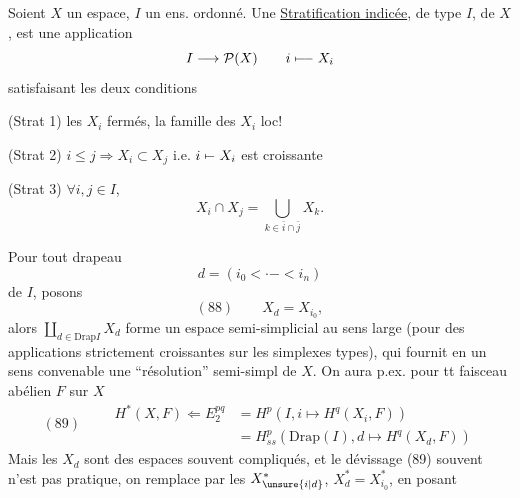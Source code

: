 
Soient $X$ un espace, $I$ un ens. ordonné.
Une \uline{Stratification indicée}, de type $I$, de $X$, est une application
\[I\longrightarrow\mathcal P(X)\qquad i\mathrel{\mapstochar\relbar\joinrel\relbar}X_i\]
satisfaisant les deux conditions

(Strat 1) les $X_i$ fermés, la famille des $X_i$  loc! 

(Strat 2) $i\leq j\Longrightarrow X_i\subset X_j$ i.e. $i\mathrel{\mapstochar\relbar}X_i$ est croissante

(Strat 3) $\forall i,j\in I$, 
\[X_i\cap X_j=\bigcup_{k\in\bar i\cap\bar j}X_k.\]

Pour tout drapeau
\[d=(i_0<\mathord{\cdot}\mathord{-}<i_n)\]
de $I$, posons
\[(88)\qquad X_d=X_{i_0},\]
alors  $\coprod_{d\in\mathrm{Drap}I}X_d$ forme un  espace semi-simplicial  au sens large (pour des applications strictement croissantes sur les simplexes types), qui fournit en un sens convenable une ``résolution'' semi-simpl de $X$. On aura p.ex. pour tt faisceau abélien $F$ sur $X$
\[
(89)\qquad\begin{aligned}
H^*(X,F)\Longleftarrow E_2^{pq}&=H^p(I,i\mapsto H^q(X_i,F))\\
&=H^p_{ss}(\mathrm{Drap}(I),d\mapsto H^q(X_d,F))
\end{aligned}
\]
Mais les  $X_d$ sont des espaces souvent compliqués, et le dévissage (89) souvent n'est pas pratique, on remplace par les $X_{\unsure{i|d}}^*$, $X_d^*=X_{i_0}^*$, en posant
